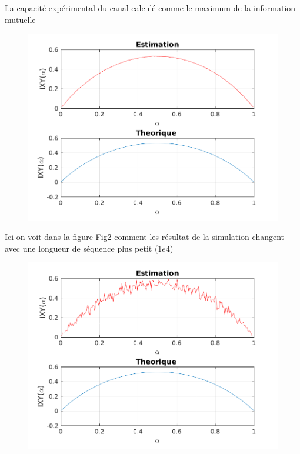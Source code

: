 \documentclass{report}
\begin{document}
La capacité expérimental du canal calculé comme le maximum de la information mutuelle 
\begin{figure}[h]
	\centering
	\captionsetup{justification=centering}
	\includegraphics[width=0.6\linewidth]{../canal3}
	\caption{}
	\label{fig:}
\end{figure}
Ici on voit dans la figure Fig\ref{fig:comparaison} comment les résultat de la simulation changent avec une longueur de séquence plus petit ($1e4$)
\begin{figure}[h]
	\centering
	\captionsetup{justification=centering}
	\includegraphics[width=0.7\linewidth]{../canal23}
	\caption{}
	\label{fig:comparaison}
\end{figure}

\end{document}
